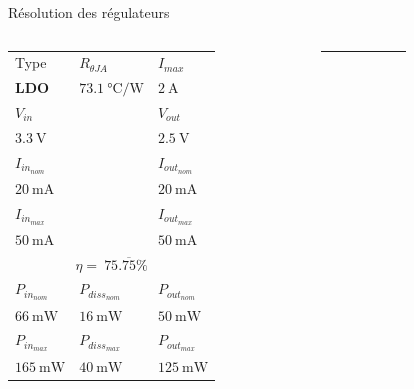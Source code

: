 \begin{frame}{Résolution des régulateurs}
    \small
    \begin{columns}
        \begin{column}{0.33\textwidth}
            \vspace{-6pt}
            \begin{tabular}{C{0.25\textwidth} | C{0.25\textwidth} | C{0.25\textwidth}}
                \\
                \hline

                Type         & $R_{\theta JA}$                & $I_{max}$\\
                \textbf{LDO} & $\SI{73.1}{\celsius\per\watt}$ & $\SI{2}{\ampere}$\\
                \hline

                $V_{in}$          & & $V_{out}$\\
                $\SI{3.3}{\volt}$ & & $\SI{2.5}{\volt}$\\
                \hline

                $I_{in_{nom}}$           & & $I_{out_{nom}}$\\
                $\SI{20}{\milli\ampere}$ & & $\SI{20}{\milli\ampere}$\\
                $I_{in_{max}}$           & & $I_{out_{max}}$\\
                $\SI{50}{\milli\ampere}$ & & $\SI{50}{\milli\ampere}$\\
                \hline

                \\
                \hline

                $P_{in_{nom}}$         & $P_{diss_{nom}}$       & $P_{out_{nom}}$\\
                $\SI{66}{\milli\watt}$ & $\SI{16}{\milli\watt}$ & $\SI{50}{\milli\watt}$\\

                $P_{in_{max}}$          & $P_{diss_{max}}$       & $P_{out_{max}}$\\
                $\SI{165}{\milli\watt}$ & $\SI{40}{\milli\watt}$ & $\SI{125}{\milli\watt}$
            \end{tabular}
        \end{column}
        \begin{column}{0.001\textwidth}
            \rule{0.1mm}{0.85\textheight}
        \end{column}
        \begin{column}{0.33\textwidth}
            \vspace{-6pt}
            \begin{tabular}{C{0.25\textwidth} | C{0.25\textwidth} | C{0.25\textwidth}}
                \\
                \hline


\end{tabular}
\end{column}
\end{columns}
\end{frame}
